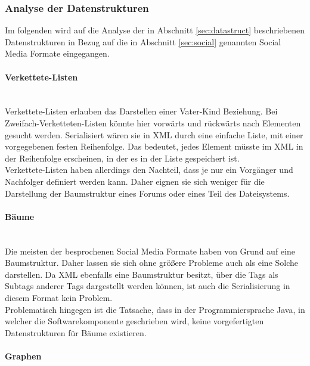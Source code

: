 \documentclass[a4paper]{article}
\begin{document}
	\subsubsection{Analyse der Datenstrukturen}
	
	Im folgenden wird auf die Analyse der in  Abschnitt \ref{sec:datastruct}
	beschriebenen Datenstrukturen in Bezug auf die in Abschnitt \ref{sec:social}
	genannten Social Media Formate eingegangen.
	
	\paragraph{Verkettete-Listen}\mbox{} \\
	
	Verkettete-Listen erlauben das Darstellen einer Vater-Kind Beziehung. Bei
	Zweifach-Verketteten-Listen könnte hier vorwärts und rückwärts nach Elementen
	gesucht werden. Serialisiert wären sie in XML durch eine einfache Liste,
	mit einer vorgegebenen festen Reihenfolge. Das bedeutet, jedes Element müsste
	im XML in der Reihenfolge erscheinen, in der es in der Liste gespeichert ist. \\
	
	Verkettete-Listen haben allerdings den Nachteil, dass je nur ein
	Vorgänger und Nachfolger definiert werden kann. Daher eignen sie sich weniger
	für die Darstellung der Baumstruktur eines Forums oder eines Teil des
	Dateisystems. 	
	
	\paragraph{Bäume}\mbox{} \\
	
	Die meisten der besprochenen Social Media Formate haben von Grund auf eine
	Baumstruktur. Daher lassen sie sich ohne größere Probleme auch als eine
	Solche darstellen. Da XML ebenfalls eine Baumstruktur besitzt, über
	die Tags als Subtags anderer Tags dargestellt werden können, ist auch
	die Serialisierung in diesem Format kein Problem. \\
	
	Problematisch hingegen ist die Tatsache, dass in der Programmiersprache 
	Java, in welcher die Softwarekomponente geschrieben wird, keine vorgefertigten
	Datenstrukturen für Bäume existieren.
	
	\paragraph{Graphen}\mbox{} \\
	
\end{document}
